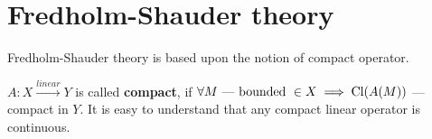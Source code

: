 \section{Fredholm-Shauder theory}
Fredholm-Shauder theory is based upon the notion of compact operator.
\begin{defn}
  $A \colon X \xrightarrow{linear} Y$ is called \textbf{compact}, if $\forall M 
  \text{ --- bounded } \in X \implies \operatorname{Cl}({A(M)})$ --- compact in $Y$. It is easy to understand that any
  compact linear operator is continuous.
\end{defn}